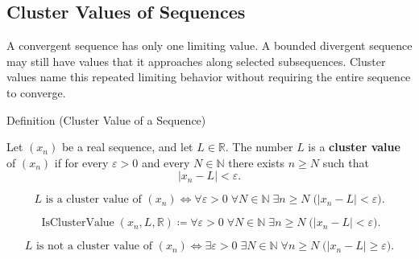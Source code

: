 \subsection*{Cluster Values of Sequences}
\begin{exposition}
A convergent sequence has only one limiting value. A bounded divergent
sequence may still have values that it approaches along selected subsequences.
Cluster values name this repeated limiting behavior without requiring the
entire sequence to converge.
\end{exposition}


\begin{definitionbox}{Definition (Cluster Value of a Sequence)}
\begin{definition}
\label{def:cluster-value-sequence}
Let $(x_n)$ be a real sequence, and let $L\in\mathbb{R}$. The number $L$ is
a \textbf{cluster value} of $(x_n)$ if for every $\varepsilon>0$ and every
$N\in\mathbb{N}$ there exists $n\ge N$ such that
\[
  |x_n-L|<\varepsilon.
\]
\end{definition}
\end{definitionbox}

\begin{remark*}
\[
L\text{ is a cluster value of }(x_n)
\Longleftrightarrow
\forall \varepsilon>0\;\forall N\in\mathbb{N}\;\exists n\ge N
\;\bigl(|x_n-L|<\varepsilon\bigr).
\]
\end{remark*}

\begin{remark*}
\[
\operatorname{IsClusterValue}(x_n,L,\mathbb{R})
\coloneqq
\forall \varepsilon>0\;\forall N\in\mathbb{N}\;\exists n\ge N
\;\bigl(|x_n-L|<\varepsilon\bigr).
\]
\end{remark*}

\begin{remark*}
\[
L\text{ is not a cluster value of }(x_n)
\Longleftrightarrow
\exists \varepsilon>0\;\exists N\in\mathbb{N}\;\forall n\ge N
\;\bigl(|x_n-L|\ge\varepsilon\bigr).
\]
\end{remark*}

